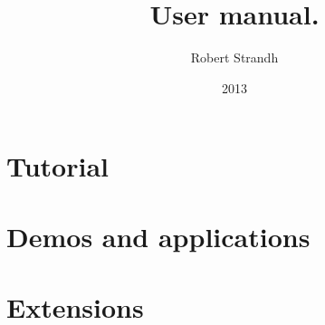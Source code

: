 \documentclass[11pt]{book}
\title{{\Huge \sysname{}}\\
User manual.}
\author{Robert Strandh}
\date{2013}
\def\inputtex#1{}
\begin{document}

\maketitle

\newpage

{\setlength{\parskip}{0cm}
\tableofcontents}

\inputtex{chap-intro.tex}

\part{Tutorial}

\inputtex{chap-first-application.tex}

\inputtex{part-reference.tex}

\part{Demos and applications}

\inputtex{chap-demos-and-applications.tex}

\part{Extensions}

\inputtex{chap-raster-image.tex}

\inputtex{part-spec-issues.tex}

{}


\printindex
\end{document}
